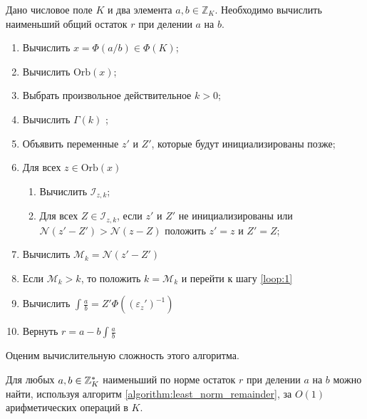 \documentclass[_00_autoref.tex]{subfiles}
\begin{document}
\begin{algorithm}\label{algorithm:least_norm_remainder}
    Дано числовое поле $K$ и два элемента $a, b \in \mathbb{Z}_K$.
    Необходимо вычислить наименьший общий остаток $r$ при делении $a$ на $b$.

    \begin{enumerate}
        \item Вычислить $x = \Phi(a/b) \in \Phi(K)$;
        
        \item Вычислить $\textrm{Orb}(x)$;

        \item Выбрать произвольное действительное $k > 0$;

        \item Вычислить $\Gamma(k)$ \label{loop:1};

        \item Объявить переменные $z'$ и $Z'$, которые будут инициализированы позже;

        \item Для всех $z \in \textrm{Orb}(x)$
        \begin{enumerate}
            \item Вычислить $\mathcal{I}_{z, k}$;

            \item Для всех $Z \in \mathcal{I}_{z, k}$, если $z'$ и $Z'$ не инициализированы или $\mathcal{N}(z' - Z') > \mathcal{N}(z - Z)$ положить $z' = z$ и $Z' = Z$;
        \end{enumerate}

        \item Вычислить $\mathcal{M}_k = \mathcal{N}(z' - Z')$
        
        \item Если $\mathcal{M}_k > k$, то положить $k = \mathcal{M}_k$ и перейти к шагу \ref{loop:1}

        \item Вычислить $\int{\frac{a}{b}} = Z'\Phi((\varepsilon_z')^{-1})$

        \item Вернуть $r = a - b \int{\frac{a}{b}}$
    \end{enumerate}
\end{algorithm}

Оценим вычислительную сложность этого алгоритма.

\begin{proposition}
    Для любых $a, b \in \mathbb{Z}_K^{*}$ наименьший по норме остаток $r$ при делении $a$ на $b$ можно найти, используя алгоритм \ref{algorithm:least_norm_remainder}, за $O(1)$ арифметических операций в $K$.
\end{proposition}
\end{document}
